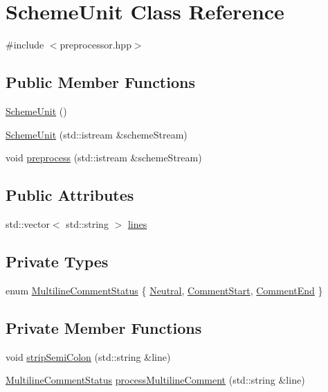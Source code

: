 \hypertarget{class_scheme_unit}{}\section{Scheme\+Unit Class Reference}
\label{class_scheme_unit}


{\ttfamily \#include $<$preprocessor.\+hpp$>$}

\subsection*{Public Member Functions}
\begin{DoxyCompactItemize}
\item 
\hyperlink{class_scheme_unit_abc10de375be742e594c79ca924cce738}{Scheme\+Unit} ()
\item 
\hyperlink{class_scheme_unit_a403e550c702c23689ff9be1d40a5847c}{Scheme\+Unit} (std\+::istream \&scheme\+Stream)
\item 
void \hyperlink{class_scheme_unit_a2dde8109fffd4bb83f74f5788253ffb2}{preprocess} (std\+::istream \&scheme\+Stream)
\end{DoxyCompactItemize}
\subsection*{Public Attributes}
\begin{DoxyCompactItemize}
\item 
std\+::vector$<$ std\+::string $>$ \hyperlink{class_scheme_unit_a03fe6130875cfc25975efc5a6f7981da}{lines}
\end{DoxyCompactItemize}
\subsection*{Private Types}
\begin{DoxyCompactItemize}
\item 
enum \hyperlink{class_scheme_unit_a90a5ac4883401fe1c38226a54ce9f43d}{Multiline\+Comment\+Status} \{ \hyperlink{class_scheme_unit_a90a5ac4883401fe1c38226a54ce9f43dafd3c8126c0b4840138b5586975c6c24e}{Neutral}, 
\hyperlink{class_scheme_unit_a90a5ac4883401fe1c38226a54ce9f43da92f34af4ca75d006abe1f83629308d9d}{Comment\+Start}, 
\hyperlink{class_scheme_unit_a90a5ac4883401fe1c38226a54ce9f43da9e9ce5882d904a46fe5fc0daa9f7194a}{Comment\+End}
 \}
\end{DoxyCompactItemize}
\subsection*{Private Member Functions}
\begin{DoxyCompactItemize}
\item 
void \hyperlink{class_scheme_unit_ae40572c01bc15883f4bb0d69044f859f}{strip\+Semi\+Colon} (std\+::string \&line)
\item 
\hyperlink{class_scheme_unit_a90a5ac4883401fe1c38226a54ce9f43d}{Multiline\+Comment\+Status} \hyperlink{class_scheme_unit_a0d43b5caa10f37002e656efadedba4bc}{process\+Multiline\+Comment} (std\+::string \&line)
\end{DoxyCompactItemize}
